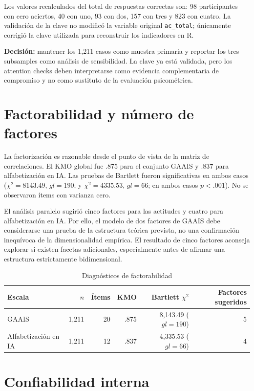 \documentclass[11pt,a4paper]{article}
\begin{document}
Los valores recalculados del total de respuestas correctas son: 98 participantes con cero aciertos, 40 con uno, 93 con dos, 157 con tres y 823 con cuatro. La validación de la clave no modificó la variable original \texttt{ac\_total}; únicamente corrigió la clave utilizada para reconstruir los indicadores en R.

\textbf{Decisión:} mantener los 1,211 casos como muestra primaria y reportar los tres subsamples como análisis de sensibilidad. La clave ya está validada, pero los attention checks deben interpretarse como evidencia complementaria de compromiso y no como sustituto de la evaluación psicométrica.

\section{Factorabilidad y número de factores}

La factorización es razonable desde el punto de vista de la matriz de correlaciones. El KMO global fue .875 para el conjunto GAAIS y .837 para alfabetización en IA. Las pruebas de Bartlett fueron significativas en ambos casos ($\chi^2=8143.49$, $gl=190$; y $\chi^2=4335.53$, $gl=66$; en ambos casos $p<.001$). No se observaron ítems con varianza cero.

El análisis paralelo sugirió cinco factores para las actitudes y cuatro para alfabetización en IA. Por ello, el modelo de dos factores de GAAIS debe considerarse una prueba de la estructura teórica prevista, no una confirmación inequívoca de la dimensionalidad empírica. El resultado de cinco factores aconseja explorar si existen facetas adicionales, especialmente antes de afirmar una estructura estrictamente bidimensional.

\begin{table}[ht]
\centering
\caption{Diagnósticos de factorabilidad}
\begin{tabular}{lrrrrr}
\toprule
Escala & $n$ & Ítems & KMO & Bartlett $\chi^2$ & Factores sugeridos \\
\midrule
GAAIS & 1,211 & 20 & .875 & 8,143.49 ($gl=190$) & 5 \\
Alfabetización en IA & 1,211 & 12 & .837 & 4,335.53 ($gl=66$) & 4 \\
\bottomrule
\end{tabular}
\end{table}

\section{Confiabilidad interna}
\end{document}

